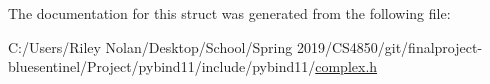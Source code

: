 The documentation for this struct was generated from the following file\+:\begin{DoxyCompactItemize}
\item 
C\+:/\+Users/\+Riley Nolan/\+Desktop/\+School/\+Spring 2019/\+C\+S4850/git/finalproject-\/bluesentinel/\+Project/pybind11/include/pybind11/\mbox{\hyperlink{complex_8h}{complex.\+h}}\end{DoxyCompactItemize}
